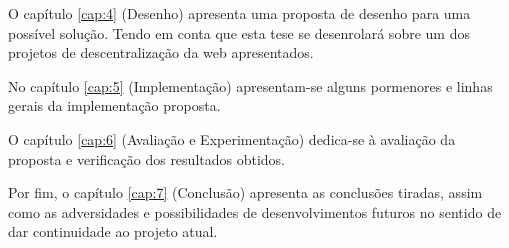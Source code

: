 O capítulo \ref{cap:4} (Desenho) apresenta uma proposta de desenho para uma possível solução. Tendo em conta que esta tese se desenrolará sobre um dos projetos de descentralização da web apresentados.

No capítulo \ref{cap:5} (Implementação) apresentam-se alguns pormenores e linhas gerais da implementação proposta.

O capítulo \ref{cap:6} (Avaliação e Experimentação) dedica-se à avaliação da proposta e verificação dos resultados obtidos.

Por fim, o capítulo \ref{cap:7} (Conclusão) apresenta as conclusões tiradas, assim como as adversidades e possibilidades de desenvolvimentos futuros no sentido de dar continuidade ao projeto atual.